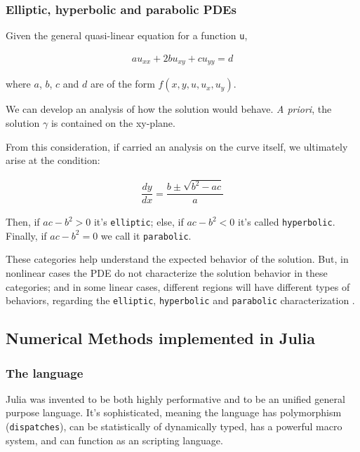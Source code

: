 \documentclass[11pt]{article}
\begin{document}
\subsubsection{Elliptic, hyperbolic and parabolic PDEs}
\label{sec:org5e5045c}
Given the general quasi-linear equation for a function \texttt{u},

\begin{equation}
\label{eq:general-2th-order}
\begin{aligned}
au_{xx} + 2bu_{xy} + cu_{yy} = d
\end{aligned}
\end{equation}

where \(a\), \(b\), \(c\) and \(d\) are of the form \(f(x,y,u,u_x,u_y)\).

We can develop an analysis of how the solution would behave. \emph{A priori}, the
solution \(\gamma\) is contained on the xy-plane.

From this consideration, if carried an analysis on the curve itself, we
ultimately arise at the condition:

\begin{equation}
\begin{aligned}
\dfrac{dy}{dx} = \dfrac{b \pm \sqrt{b^2 -ac}}{a}
\end{aligned}
\end{equation}

Then, if \(ac-b^2>0\) it's \texttt{elliptic}; else, if \(ac-b^2<0\) it's called
\texttt{hyperbolic}. Finally, if \(ac-b^2=0\) we call it \texttt{parabolic}.

These categories help understand the expected behavior of the solution. But, in
nonlinear cases the PDE do not characterize the solution behavior in these
categories; and in some linear cases, different regions will have different
types of behaviors, regarding the \texttt{elliptic}, \texttt{hyperbolic} and \texttt{parabolic}
characterization \cite{john1978partial}.

\subsection{Numerical Methods implemented in Julia}
\label{sec:org539b488}
\label{sec:num-julia}

\subsubsection{The language}
\label{sec:org297c693}
Julia was invented to be both highly performative and to be an unified general
purpose language. It's sophisticated, meaning the language has polymorphism
(\texttt{dispatches}), can be statistically of dynamically typed, has a powerful macro
system, and can function as an scripting language.
\end{document}
